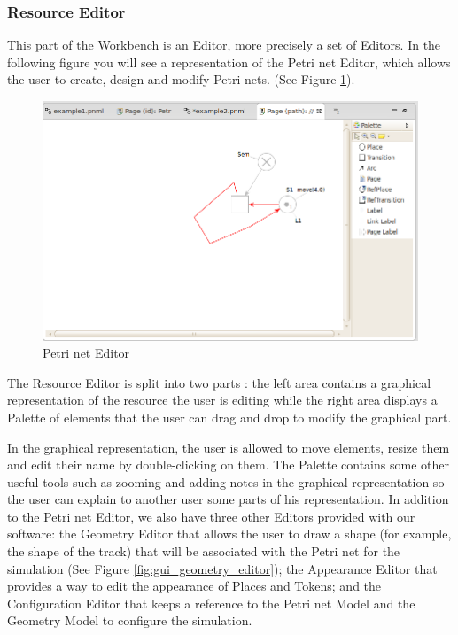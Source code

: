 \subsubsection{Resource Editor}
This part of the Workbench is an Editor, more precisely a set of Editors. In the following figure you will see a representation of the Petri net Editor,
which allows the user to create, design and modify Petri nets. (See Figure \ref{fig:gui_petri_editor}).

\begin{figure}[htp]
\begin{center}
  \includegraphics[scale=0.45]{image/gui_petrinet.png}
  \caption{Petri net Editor}
  \label{fig:gui_petri_editor}
\end{center}
\end{figure}

The Resource Editor is split into two parts : the left area contains a graphical representation of the resource the user is editing while the right area displays a
Palette of elements that the user can drag and drop to modify the graphical part.

In the graphical representation, the user is allowed to move elements, resize them and edit their name by double-clicking on them. The Palette contains some other useful tools such as zooming and adding notes in the graphical representation so the user can explain to another user some parts of his representation. In addition to the Petri net Editor, we also have three other Editors provided with our software: the Geometry Editor that allows the user to draw a shape (for example, the shape of the track) that will be associated with the Petri net for the simulation (See Figure \ref{fig:gui_geometry_editor}); the Appearance Editor that provides a way to edit the appearance of Places and Tokens; and the Configuration Editor that keeps a reference to the Petri net Model and the Geometry Model to configure the simulation.

